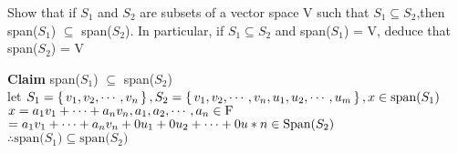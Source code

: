 Show that if $S_1$ and $S_2$ are subsets of a vector space $\mathrm{V}$ such that $S_1 \subseteq S_2$,then span($S_1$) $\subseteq$ span($S_2$). In particular, if $S_1 \subseteq S_2$ and span($S_1$) = $\mathrm{V}$, deduce that span($S_2$) = $\mathrm{V}$

\begin{tcolorbox}
	\begin{solution}
		
		\textbf{Claim} span($S_1$) $\subseteq$ span($S_2$)\\
		let $S_1 = \left\{ \,v_1,v_2,\cdots,v_n \,\right\}, S_2 = \left\{ \,v_1,v_2,\cdots,v_n,u_1,u_2,\cdots,u_m \,\right\}, x \in \text{span($S_1$)}$\\
		$x = a_1v_1+\cdots+a_nv_n ,a_1,a_2,\cdots,a_n \in \mathrm{F}$\\
		$= a_1v_1+\cdots+a_nv_n+0u_1 + 0u_2+\cdots+0u*n \in \text{Span($S_2$)}$\\
		$\therefore \text{span($S_1$)} \subseteq \text{span($S_2$)}$
		
		
	\end{solution}
\end{tcolorbox}